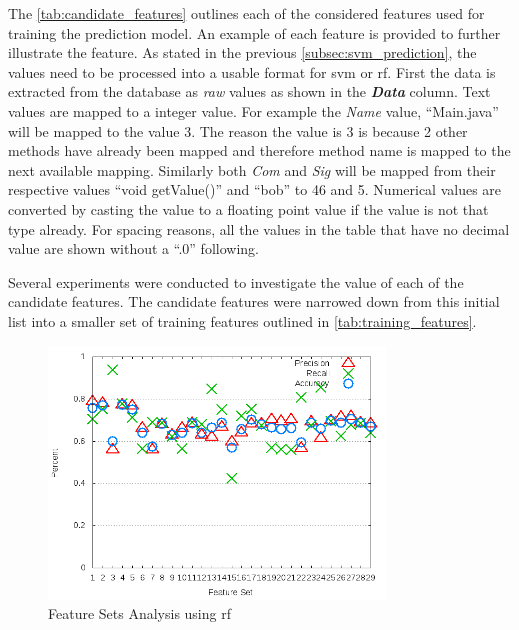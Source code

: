 
The \autoref{tab:candidate_features} outlines each of the considered features used for training the prediction model. An example of each feature is provided to further illustrate the feature. As stated in the previous \autoref{subsec:svm_prediction}, the values need to be processed into a usable format for \gls{svm} or \gls{rf}. First the data is extracted from the database as \textit{raw} values as shown in the \textit{\textbf{Data}} column. Text values are mapped to a integer value. For example the \textit{Name} value, ``Main.java'' will be mapped to the value 3. The reason the value is 3 is because 2 other methods have already been mapped and therefore method name is mapped to the next available mapping. Similarly both \textit{Com} and \textit{Sig} will be mapped from their respective values ``void getValue()'' and ``bob'' to 46 and 5. Numerical values are converted by casting the value to a floating point value if the value is not that type already. For spacing reasons, all the values in the table that have no decimal value are shown without a ``.0'' following.

Several experiments were conducted to investigate the value of each of the candidate features. The candidate features were narrowed down from this initial list into a smaller set of training features outlined in \autoref{tab:training_features}.

\begin{figure}[!t]
    \centering
        \includegraphics[width=0.8\textwidth]{images/rf/test_6/acra_sample_range}
        \caption{Feature Sets Analysis using \gls{rf}}
        \label{fig:feature_set_acra_rf}
\end{figure}

